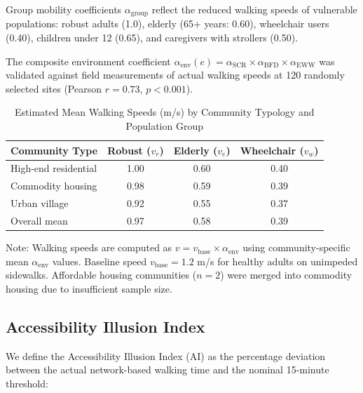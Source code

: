 \documentclass[10pt,conference,compsoc]{IEEEtran}
\begin{document}
Group mobility coefficients $\alpha_{\text{group}}$ reflect the reduced walking speeds of vulnerable populations: robust adults (1.0), elderly (65+ years: 0.60), wheelchair users (0.40), children under 12 (0.65), and caregivers with strollers (0.50).

The composite environment coefficient $\alpha_{\text{env}}(e) = \alpha_{\text{SCR}} \times \alpha_{\text{BFD}} \times \alpha_{\text{EWW}}$ was validated against field measurements of actual walking speeds at 120 randomly selected sites (Pearson $r = 0.73$, $p < 0.001$).

\begin{table}[htbp]
\caption{Estimated Mean Walking Speeds (m/s) by Community Typology and Population Group}
\label{tab:velocity_model}
\begin{center}
\begin{threeparttable}
\begin{tabular}{lccc}
\toprule
Community Type & Robust ($v_r$) & Elderly ($v_e$) & Wheelchair ($v_w$) \\
\midrule
High-end residential & 1.00 & 0.60 & 0.40 \\
Commodity housing & 0.98 & 0.59 & 0.39 \\
Urban village & 0.92 & 0.55 & 0.37 \\
\midrule
Overall mean & 0.97 & 0.58 & 0.39 \\
\bottomrule
\end{tabular}
\begin{tablenotes}
\item Note: Walking speeds are computed as $v = v_{\text{base}} \times \alpha_{\text{env}}$ using community-specific mean $\alpha_{\text{env}}$ values. Baseline speed $v_{\text{base}} = 1.2$ m/s for healthy adults on unimpeded sidewalks. Affordable housing communities ($n=2$) were merged into commodity housing due to insufficient sample size.
\end{tablenotes}
\end{threeparttable}
\end{center}
\end{table}

\subsection{Accessibility Illusion Index}

We define the Accessibility Illusion Index (AI) as the percentage deviation between the actual network-based walking time and the nominal 15-minute threshold:
\end{document}
